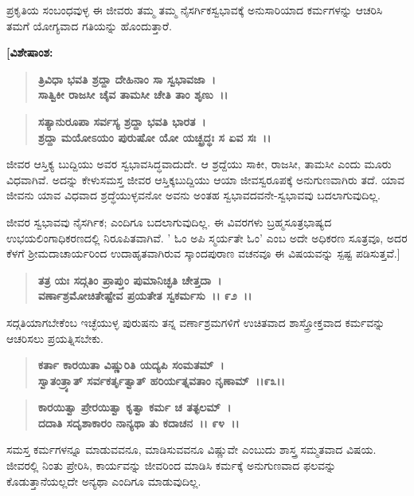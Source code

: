 ಪ್ರಕೃತಿಯ ಸಂಬಂಧವುಳ್ಳ ಈ ಜೀವರು ತಮ್ಮ ತಮ್ಮ ನೈಸರ್ಗಿಕಸ್ವಭಾವಕ್ಕೆ ಅನುಸಾರಿಯಾದ ಕರ್ಮಗಳನ್ನು ಆಚರಿಸಿ ತಮಗೆ ಯೋಗ್ಯವಾದ ಗತಿಯನ್ನು ಹೊಂದುತ್ತಾರೆ.

\begin{flushleft}
\textbf{[ವಿಶೇಷಾಂಶ:} 
\end{flushleft}

\begin{verse}
\textbf{ತ್ರಿವಿಧಾ ಭವತಿ ಶ್ರದ್ದಾ ದೇಹಿನಾಂ ಸಾ ಸ್ವಭಾವಜಾ~।}\\\textbf{ಸಾತ್ವಿಕೀ ರಾಜಸೀ ಚೈವ ತಾಮಸೀ ಚೇತಿ ತಾಂ ಶೃಣು~।।}
\end{verse}

\begin{verse}
\textbf{ಸತ್ಯಾನುರೂಪಾ ಸರ್ವಸ್ಯ ಶ್ರದ್ದಾ ಭವತಿ ಭಾರತ~।}\\\textbf{ಶ್ರದ್ದಾ ಮಯೋಽಯಂ ಪುರುಷೋ ಯೋ ಯಚ್ಛ್ರದ್ಧಃ ಸ ಏವ ಸಃ~।।} 
\end{verse}

ಜೀವರ ಆಸ್ತಿಕ್ಯ ಬುದ್ದಿಯು ಅವರ ಸ್ವಭಾವಸಿದ್ಧವಾದುದೇ. ಆ ಶ್ರದ್ದೆಯು ಸಾಕೀ, ರಾಜಸೀ, ತಾಮಸೀ ಎಂದು ಮೂರು ವಿಧವಾಗಿವೆ. ಅದನ್ನು ಕೇಳುಸಮಸ್ತ ಜೀವರ ಆಸ್ತಿಕ್ಕಬುದ್ದಿಯು ಆಯಾ ಜೀವಸ್ವರೂಪಕ್ಕೆ ಅನುಗುಣವಾಗಿರು ತದೆ. ಯಾವ ಜೀವನು ಯಾವ ವಿಧವಾದ ಶ್ರದ್ಧೆಯುಳ್ಳವನೋ ಅವನು ಅಂತಹ ಸ್ವಭಾವದವನೇ-ಸ್ವಭಾವವು ಬದಲಾಗುವುದಿಲ್ಲ.

ಜೀವರ ಸ್ವಭಾವವು ನೈಸರ್ಗಿಕ; ಎಂದಿಗೂ ಬದಲಾಗುವುದಿಲ್ಲ. ಈ ವಿವರಗಳು ಬ್ರಹ್ಮಸೂತ್ರಭಾಷ್ಯದ ಉಭಯಲಿಂಗಾಧಿಕರಣದಲ್ಲಿ ನಿರೂಪಿತವಾಗಿವೆ. ' ಓಂ ಅಪಿ ಸ್ಮರ್ಯತೇ ಓಂ' ಎಂಬ ಅದೇ ಅಧಿಕರಣ ಸೂತ್ರವೂ, ಅದರ ಕೆಳಗೆ ಶ‍್ರೀಮದಾಚಾರ್ಯರಿಂದ ಉದಾಹೃತವಾಗಿರುವ ಸ್ಕಾಂದಪುರಾಣ ವಚನವೂ ಈ ವಿಷಯವನ್ನು ಸ್ಪಷ್ಟ ಪಡಿಸುತ್ತವೆ.]

\begin{verse}
\textbf{ತತ್ರ ಯಃ ಸದ್ಗತಿಂ ಪ್ರಾಪ್ತುಂ ಪುಮಾನಿಚ್ಛತಿ ಚೇತ್ತದಾ~।}\\\textbf{ವರ್ಣಾಶ್ರಮೋಚಿತೇಷ್ಟೇವ ಪ್ರಯತೇತ ಸ್ವಕರ್ಮಸು~।। ೯೨~।।}
\end{verse}

ಸದ್ಗತಿಯಾಗಬೇಕೆಂಬ ಇಚ್ಛೆಯುಳ್ಳ ಪುರುಷನು ತನ್ನ ವರ್ಣಾಶ್ರಮಗಳಿಗೆ ಉಚಿತವಾದ ಶಾಸ್ತ್ರೋಕ್ತವಾದ ಕರ್ಮವನ್ನು ಆಚರಿಸಲು ಪ್ರಯತ್ನಿಸಬೇಕು.

\begin{verse}
\textbf{ಕರ್ತಾ ಕಾರಯಿತಾ ವಿಷ್ಣುರಿತಿ ಯದ್ಯಪಿ ಸಂಮತಮ್~।}\\\textbf{ಸ್ವಾತಂತ್ರ್ಯಾತ್ ಸರ್ವಕರ್ತೃತ್ವಾತ್ ಹರಿರ್ಯತ್ನವತಾಂ ನೃಣಾಮ್~।।೯೩।। }
\end{verse}

\begin{verse}
\textbf{ಕಾರಯಿತ್ವಾ ಪ್ರೇರಯಿತ್ವಾ ಕೃತ್ವಾ ಕರ್ಮ ಚ ತತ್ಫಲಮ್~।}\\\textbf{ದದಾತಿ ಸದೃಶಾಕಾರಂ ನಾನ್ಯಥಾ ತು ಕದಾಚನ~।। ೯೪~।।}
\end{verse}

ಸಮಸ್ತ ಕರ್ಮಗಳನ್ನೂ ಮಾಡುವವನೂ, ಮಾಡಿಸುವವನೂ ವಿಷ್ಣುವೇ ಎಂಬುದು ಶಾಸ್ತ್ರ ಸಮ್ಮತವಾದ ವಿಷಯ. ಜೀವರಲ್ಲಿ ನಿಂತು ಪ್ರೇರಿಸಿ, ಕಾರ್ಯವನ್ನು ಜೀವರಿಂದ ಮಾಡಿಸಿ ಕರ್ಮಕ್ಕೆ ಅನುಗುಣವಾದ ಫಲವನ್ನು ಕೊಡುತ್ತಾನೆಯಲ್ಲದೇ ಅನ್ಯಥಾ ಎಂದಿಗೂ ಮಾಡುವುದಿಲ್ಲ.

